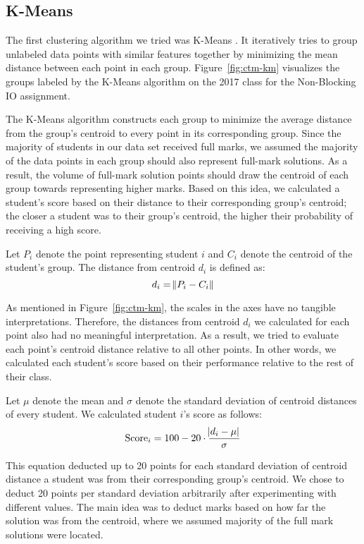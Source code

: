 \subsection{K-Means}
\label{sec:ctm-km}

The first clustering algorithm we tried was K-Means \cite{macqueen1967some}. It iteratively tries to group unlabeled data points with similar features together by minimizing the mean distance between each point in each group. Figure~\ref{fig:ctm-km} visualizes the groups labeled by the K-Means algorithm on the 2017 class for the Non-Blocking IO assignment.

The K-Means algorithm constructs each group to minimize the average distance from the group's centroid to every point in its corresponding group. Since the majority of students in our data set received full marks, we assumed the majority of the data points in each group should also represent full-mark solutions. As a result, the volume of full-mark solution points should draw the centroid of each group towards  representing higher marks. Based on this idea, we calculated a student's score based on their distance to their corresponding group's centroid; the closer a student was to their group's centroid, the higher their probability of receiving a high score.

Let $P_i$ denote the point representing student $i$ and $C_i$ denote the centroid of the student's group. The distance from centroid $d_i$ is defined as:
\begin{equation*}
d_i = \norm{P_i - C_i}
\end{equation*}

As mentioned in Figure~\ref{fig:ctm-km}, the scales in the axes have no tangible interpretations. Therefore, the distances from centroid $d_i$ we calculated for each point also had no meaningful interpretation. As a result, we tried to evaluate each point's centroid distance relative to all other points. In other words, we calculated each student's score based on their performance relative to the rest of their class.

Let $\mu$ denote the mean and $\sigma$ denote the standard deviation of centroid distances of every student. We calculated student $i$'s score as follows:
\begin{equation*}
\text{Score}_i = 100 - 20 \cdot \frac{\abs{d_i - \mu}}{\sigma}
\end{equation*}

This equation deducted up to 20 points for each standard deviation of centroid distance a student was from their corresponding group's centroid. We chose to deduct 20 points per standard deviation arbitrarily after experimenting with different values. The main idea was to deduct marks based on how far the solution was from the centroid, where we assumed majority of the full mark solutions were located.

